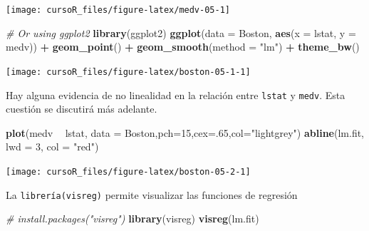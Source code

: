 \documentclass[]{book}
\newenvironment{Shaded}{\begin{snugshade}}{\end{snugshade}}
\newcommand{\KeywordTok}[1]{\textcolor[rgb]{0.13,0.29,0.53}{\textbf{#1}}}
\newcommand{\DataTypeTok}[1]{\textcolor[rgb]{0.13,0.29,0.53}{#1}}
\newcommand{\DecValTok}[1]{\textcolor[rgb]{0.00,0.00,0.81}{#1}}
\newcommand{\StringTok}[1]{\textcolor[rgb]{0.31,0.60,0.02}{#1}}
\newcommand{\CommentTok}[1]{\textcolor[rgb]{0.56,0.35,0.01}{\textit{#1}}}
\newcommand{\OperatorTok}[1]{\textcolor[rgb]{0.81,0.36,0.00}{\textbf{#1}}}
\newcommand{\NormalTok}[1]{#1}
\begin{document}
\begin{center}\texttt{[image: cursoR\_files/figure-latex/medv-05-1]} \end{center}

\begin{Shaded}
\begin{Highlighting}[]
\CommentTok{# Or using ggplot2}
\KeywordTok{library}\NormalTok{(ggplot2)}
\KeywordTok{ggplot}\NormalTok{(}\DataTypeTok{data =}\NormalTok{ Boston, }\KeywordTok{aes}\NormalTok{(}\DataTypeTok{x =}\NormalTok{ lstat, }\DataTypeTok{y =}\NormalTok{ medv)) }\OperatorTok{+}
\StringTok{  }\KeywordTok{geom_point}\NormalTok{() }\OperatorTok{+}\StringTok{ }
\StringTok{  }\KeywordTok{geom_smooth}\NormalTok{(}\DataTypeTok{method =} \StringTok{"lm"}\NormalTok{) }\OperatorTok{+}\StringTok{ }
\StringTok{  }\KeywordTok{theme_bw}\NormalTok{()}
\end{Highlighting}
\end{Shaded}

\begin{center}\texttt{[image: cursoR\_files/figure-latex/boston-05-1-1]} \end{center}

Hay alguna evidencia de no linealidad en la relación entre
\texttt{lstat} y \texttt{medv}. Esta cuestión se discutirá más adelante.

\begin{Shaded}
\begin{Highlighting}[]
\KeywordTok{plot}\NormalTok{(medv }\OperatorTok{~}\StringTok{ }\NormalTok{lstat, }\DataTypeTok{data =}\NormalTok{ Boston,}\DataTypeTok{pch=}\DecValTok{15}\NormalTok{,}\DataTypeTok{cex=}\NormalTok{.}\DecValTok{65}\NormalTok{,}\DataTypeTok{col=}\StringTok{"lightgrey"}\NormalTok{)}
\KeywordTok{abline}\NormalTok{(lm.fit, }\DataTypeTok{lwd =} \DecValTok{3}\NormalTok{, }\DataTypeTok{col =} \StringTok{"red"}\NormalTok{)}
\end{Highlighting}
\end{Shaded}

\begin{center}\texttt{[image: cursoR\_files/figure-latex/boston-05-2-1]} \end{center}

La \texttt{librería(visreg)} permite visualizar las funciones de
regresión

\begin{Shaded}
\begin{Highlighting}[]
\CommentTok{# install.packages("visreg")}
\KeywordTok{library}\NormalTok{(visreg)}
\KeywordTok{visreg}\NormalTok{(lm.fit)}
\end{Highlighting}
\end{Shaded}
\end{document}
